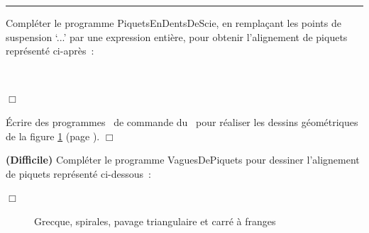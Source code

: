 \noindent \rule{137mm}{0.1mm} %
\begin{exercice}{ Compléter le programme {\idt PiquetsEnDentsDeScie}, en remplaçant les
points de suspension `{\idt ...}' par une expression entière, pour
ob\-te\-nir l'alignement de piquets représenté ci-après~:
\clearpage

\raggedright{
\vspace*{20mm}%
\ \\%
}



\noindent $\Box$}\end{exercice}
\begin{exercice}{ Écrire des programmes \ocaml\ de commande du \robot\ pour réaliser les
dessins géométriques de la figure  \ref{fig:spcf} (page  \pageref{fig:spcf}). $\Box$}\end{exercice}
\begin{exercice}{{\bf (Difficile)} Compléter le programme {\idt VaguesDePiquets} pour
des\-si\-ner l'alignement de piquets représenté ci-dessous~:

\pagebreak[3]
\raggedright{
\vspace{0.5cm}

}


\noindent $\Box$}\end{exercice}
\begin{figure}[hb]%
\caption{Grecque, spirales, pavage triangulaire et carré à franges}
 \label{fig:spcf}
\end{figure}

\clearpage

